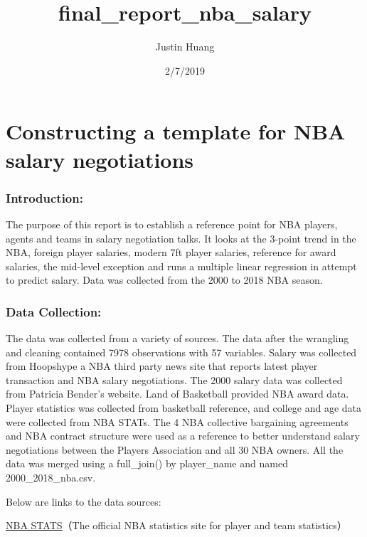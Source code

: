 \documentclass[]{article}
\title{final\_report\_nba\_salary}
\author{Justin Huang}
\date{2/7/2019}
\begin{document}
\maketitle

\section{Constructing a template for NBA salary
negotiations}\label{constructing-a-template-for-nba-salary-negotiations}

\subsubsection{\texorpdfstring{\textbf{Introduction:}}{Introduction:}}\label{introduction}

The purpose of this report is to establish a reference point for NBA
players, agents and teams in salary negotiation talks. It looks at the
3-point trend in the NBA, foreign player salaries, modern 7ft player
salaries, reference for award salaries, the mid-level exception and runs
a multiple linear regression in attempt to predict salary. Data was
collected from the 2000 to 2018 NBA season.

\subsubsection{\texorpdfstring{\textbf{Data
Collection:}}{Data Collection:}}\label{data-collection}

The data was collected from a variety of sources. The data after the
wrangling and cleaning contained 7978 observations with 57 variables.
Salary was collected from Hoopshype a NBA third party news site that
reports latest player transaction and NBA salary negotiations. The 2000
salary data was collected from Patricia Bender's website. Land of
Basketball provided NBA award data. Player statistics was collected from
basketball reference, and college and age data were collected from NBA
STATs. The 4 NBA collective bargaining agreements and NBA contract
structure were used as a reference to better understand salary
negotiations between the Players Association and all 30 NBA owners. All
the data was merged using a full\_join() by player\_name and named
2000\_2018\_nba.csv.

Below are links to the data sources:

\href{https://stats.nba.com}{NBA STATS}（The official NBA statistics
site for player and team statistics）
\end{document}
